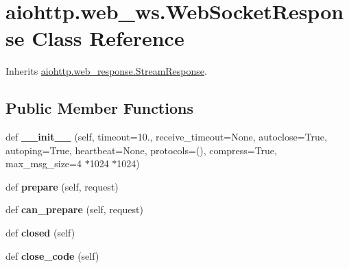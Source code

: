 \hypertarget{classaiohttp_1_1web__ws_1_1_web_socket_response}{}\section{aiohttp.\+web\+\_\+ws.\+Web\+Socket\+Response Class Reference}
\label{classaiohttp_1_1web__ws_1_1_web_socket_response}


Inherits \hyperlink{classaiohttp_1_1web__response_1_1_stream_response}{aiohttp.\+web\+\_\+response.\+Stream\+Response}.

\subsection*{Public Member Functions}
\begin{DoxyCompactItemize}
\item 
\mbox{\label{classaiohttp_1_1web__ws_1_1_web_socket_response_a05eb718ee3c79d9f95fb81b1798b80cd}} 
def {\bfseries \+\_\+\+\_\+init\+\_\+\+\_\+} (self, timeout=10., receive\+\_\+timeout=None, autoclose=True, autoping=True, heartbeat=None, protocols=(), compress=True, max\+\_\+msg\+\_\+size=4 $\ast$1024 $\ast$1024)
\item 
\mbox{\label{classaiohttp_1_1web__ws_1_1_web_socket_response_a4f719cd7c2345a2a378d43788acf4bfc}} 
def {\bfseries prepare} (self, request)
\item 
\mbox{\label{classaiohttp_1_1web__ws_1_1_web_socket_response_a73dad1e7a446ddc8c654b662e1a42819}} 
def {\bfseries can\+\_\+prepare} (self, request)
\item 
\mbox{\label{classaiohttp_1_1web__ws_1_1_web_socket_response_a6f966305129d421736d7fcfc153382dd}} 
def {\bfseries closed} (self)
\item 
\mbox{\label{classaiohttp_1_1web__ws_1_1_web_socket_response_ad4d8e29e4aee3e63964b602f321bafc3}} 
def {\bfseries close\+\_\+code} (self)
\item 
\mbox{\label{classaiohttp_1_1web__ws_1_1_web_socket_response_a2f1f12d4398c415faa9e64f1e30b00a0}} 

\end{DoxyCompactItemize}
